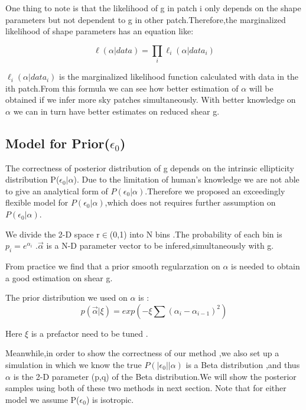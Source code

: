 \documentclass[useAMS,usenatbib]{mn2e}
\begin{document}
One thing to note is that the likelihood of g in patch i only depends
on the shape parameters but not dependent to g in other patch.Therefore,the
marginalized likelihood of shape parameters has an equation like:

\begin{equation}
\ell(\alpha|data)=\prod_{i}\ell_{i}(\alpha|data_{i})
\end{equation}


$\ell_{i}(\alpha|data_{i})$ is the marginalized likelihood function
calculated with data in the ith patch.From this formula we can see
how better estimation of $\alpha$ will be obtained if we infer more
sky patches simultaneously. With better knowledge on $\alpha$ we
can in turn have better estimates on reduced shear g.


\subsection{Model for Prior($\epsilon_{0}$)}

The correctness of posterior distribution of g depends on the intrinsic
ellipticity distribution P($\epsilon_{0}|\alpha$). Due to the limitation
of human's knowledge we are not able to give an analytical form of
$P(\epsilon_{0}|\alpha)$.Therefore we proposed an exceedingly flexible
model for $P(\epsilon_{0}|\alpha)$,which does not requires further
assumption on $P(\epsilon_{0}|\alpha)$.

We divide the 2-D space r$\in$(0,1) into N bins .The probability
of each bin is $p_{i}=e^{\alpha_{i}}$ .$\overrightarrow{\alpha}$
is a N-D parameter vector to be infered,simultaneously with g.

From practice we find that a prior smooth regularzation on $\alpha$
is needed to obtain a good estimation on shear g.

The prior distribution we used on $\alpha$ is : 
\begin{equation}
p(\vec{\alpha}|\xi)=exp(-\xi\sum(\alpha_{i}-\alpha_{i-1})^{2})
\end{equation}


Here $\xi$ is a prefactor need to be tuned .

Meanwhile,in order to show the correctness of our method ,we also
set up a simulation in which we know the true $P(|\epsilon_{0}||\alpha)$
is a Beta distribution ,and thus $\alpha$ is the 2-D parameter (p,q)
of the Beta distribution.We will show the posterior samples using
both of these two methods in next section. Note that for either model
we assume P($\epsilon_{0}$) is isotropic.
\end{document}
